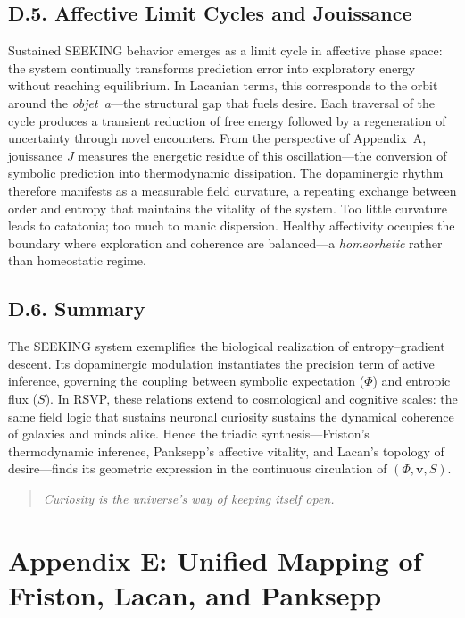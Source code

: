 \documentclass[12pt,a4paper]{article}
\begin{document}
\subsection*{D.5. Affective Limit Cycles and Jouissance}

Sustained \textsc{SEEKING} behavior emerges as a limit cycle in affective phase space: the system continually transforms prediction error into exploratory energy without reaching equilibrium.  
In Lacanian terms, this corresponds to the orbit around the \emph{objet~a}—the structural gap that fuels desire.  
Each traversal of the cycle produces a transient reduction of free energy followed by a regeneration of uncertainty through novel encounters.  
From the perspective of Appendix~A, jouissance $J$ measures the energetic residue of this oscillation—the conversion of symbolic prediction into thermodynamic dissipation.  
The dopaminergic rhythm therefore manifests as a measurable field curvature, a repeating exchange between order and entropy that maintains the vitality of the system.  
Too little curvature leads to catatonia; too much to manic dispersion.  
Healthy affectivity occupies the boundary where exploration and coherence are balanced—a \emph{homeorhetic} rather than homeostatic regime.

\subsection*{D.6. Summary}

The \textsc{SEEKING} system exemplifies the biological realization of entropy–gradient descent.  
Its dopaminergic modulation instantiates the precision term of active inference, governing the coupling between symbolic expectation ($\Phi$) and entropic flux ($S$).  
In RSVP, these relations extend to cosmological and cognitive scales: the same field logic that sustains neuronal curiosity sustains the dynamical coherence of galaxies and minds alike.  
Hence the triadic synthesis—Friston’s thermodynamic inference, Panksepp’s affective vitality, and Lacan’s topology of desire—finds its geometric expression in the continuous circulation of $(\Phi,\mathbf{v},S)$.

\begin{quote}
\textit{Curiosity is the universe’s way of keeping itself open.}
\end{quote}


\section*{Appendix E: Unified Mapping of Friston, Lacan, and Panksepp}
\end{document}
